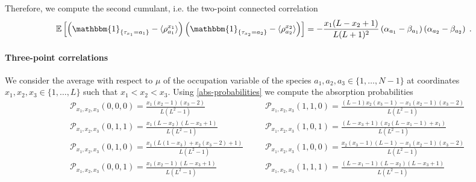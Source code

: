 \documentclass[10pt]{article}
\numberwithin{equation}{section}
\numberwithin{equation}{subsection}
\newcommand{\dt}{\;.}
\begin{document}
Therefore, we compute the second cumulant, i.e. the two-point connected correlation
\begin{equation}\label{two-pts-corr}
	\begin{split}
		 \mathbb{E}\left[\left(\mathbbm{1}_{\{\tau_{x_{1}}=a_{1}\}}-\langle\rho_{a_{1}}^{x_{1}}\rangle \right)\left(\mathbbm{1}_{\{\tau_{x_{2}}=a_{2}\}}-\langle\rho_{a_{2}}^{x_{2}}\rangle \right)\right]=-\frac{x_{1}(L-x_{2}+1)}{L(L+1)^{2}}\left(\alpha_{a_{1}}-\beta_{a_{1}}\right)\left(\alpha_{a_{2}}-\beta_{a_{2}}\right)\dt
	\end{split}
\end{equation}
\paragraph{Three-point correlations}
We consider the average with respect to $\mu$ of the occupation variable of the species  $a_{1},a_{2},a_{3}\in \{1,\ldots,N-1\}$ at coordinates $x_{1},x_{2},x_{3}\in \{1,\ldots,L\}$ such that $x_{1}<x_{2}<x_{3}$. Using \eqref{abs-probabilities} we compute the absorption probabilities 
\begin{equation}
	\begin{split}
	&\mathcal{P}_{x_{1},x_{2},x_{3}}(0,0,0)=\frac{x_{1}(x_{2}-1)(x_{3}-2)}{L(L^{2}-1)}\\
 &\mathcal{P}_{x_{1},x_{2},x_{3}}(0,1,1)=\frac{x_1 (L-x_2) (L-x_3+1)}{L \left(L^2-1\right)}\\
	&\mathcal{P}_{x_{1},x_{2},x_{3}}(0,1,0)=\frac{x_1 (L(1-x_3)+x_2 (x_3-2)+1)}{L(L^2-1)}\\
	&\mathcal{P}_{x_{1},x_{2},x_{3}}(0,0,1)=\frac{x_1 (x_2-1) (L-x_3+1)}{L \left(L^2-1\right)}
	\end{split}\quad \begin{split}
	&\mathcal{P}_{x_{1},x_{2},x_{3}}(1,1,0)=\frac{(L-1) x_2 (x_3-1)-x_1 (x_2-1)
		(x_3-2)}{L \left(L^2-1\right)}\\
	&\mathcal{P}_{x_{1},x_{2},x_{3}}(1,0,1)=\frac{(L-x_3+1) (x_2 (L-x_1-1)+x_1)}{L
		\left(L^2-1\right)}\\
	&\mathcal{P}_{x_{1},x_{2},x_{3}}(1,0,0)=\frac{ x_{2} (x_3-1)(L-1)-x_1 (x_2-1)
	(x_3-2)}{L \left(L^2-1\right)}\\
	&\mathcal{P}_{x_{1},x_{2},x_{3}}(1,1,1)=\frac{(L-x_{1}-1)(L-x_{2})(L-x_{3}+1)}{L(L^{2}-1)}
\end{split}
\end{equation}
\end{document}
